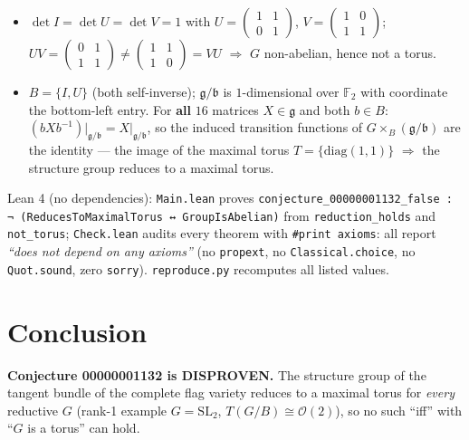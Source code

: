 \documentclass[11pt]{article}
\begin{document}
\begin{itemize}
\item $\det I = \det U = \det V = 1$ with $U=\left(\begin{smallmatrix}1&1\\0&1\end{smallmatrix}\right)$, $V=\left(\begin{smallmatrix}1&0\\1&1\end{smallmatrix}\right)$; $U V = \left(\begin{smallmatrix}0&1\\1&1\end{smallmatrix}\right) \neq \left(\begin{smallmatrix}1&1\\1&0\end{smallmatrix}\right) = V U$ \;\;$\Rightarrow$ $G$ non-abelian, hence not a torus.
\item $B=\{I,U\}$ (both self-inverse); $\mathfrak{g}/\mathfrak{b}$ is $1$-dimensional over $\mathbb{F}_2$ with coordinate the bottom-left entry. For \textbf{all} $16$ matrices $X\in\mathfrak{g}$ and both $b\in B$: $(bXb^{-1})\bigr|_{\mathfrak{g}/\mathfrak{b}} = X\bigr|_{\mathfrak{g}/\mathfrak{b}}$, so the induced transition functions of $G\times_B(\mathfrak{g}/\mathfrak{b})$ are the identity --- the image of the maximal torus $T=\{\mathrm{diag}(1,1)\}$ \;\;$\Rightarrow$ the structure group reduces to a maximal torus.
\end{itemize}

Lean 4 (no dependencies): \texttt{Main.lean} proves
\texttt{conjecture\_00000001132\_false : ¬ (ReducesToMaximalTorus ↔ GroupIsAbelian)}
from \texttt{reduction\_holds} and \texttt{not\_torus}; \texttt{Check.lean} audits every theorem with \texttt{\#print axioms}: all report \emph{``does not depend on any axioms''} (no \texttt{propext}, no \texttt{Classical.choice}, no \texttt{Quot.sound}, zero \texttt{sorry}). \texttt{reproduce.py} recomputes all listed values.

\section{Conclusion}

\textbf{Conjecture 00000001132 is DISPROVEN.} The structure group of the tangent bundle of the complete flag variety reduces to a maximal torus for \emph{every} reductive $G$ (rank-1 example $G=\mathrm{SL}_2$, $T(G/B) \cong \mathcal{O}(2)$), so no such ``iff'' with ``$G$ is a torus'' can hold.
\end{document}
